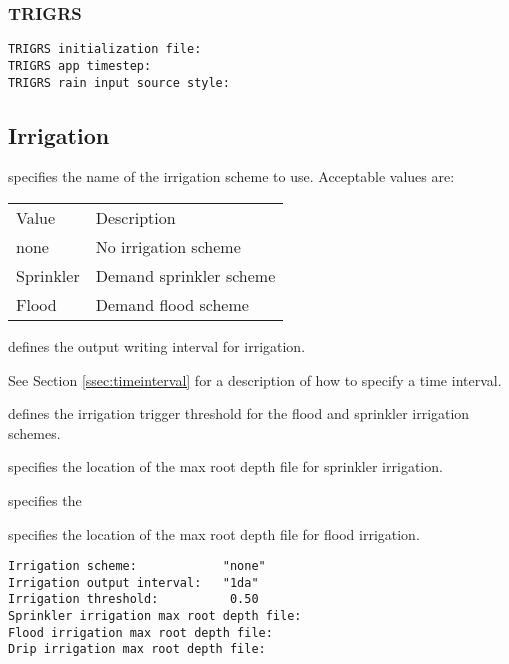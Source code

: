  
 \subsubsection{TRIGRS} \label{sssec:trigrs}
  

  

  
 

 \begin{Verbatim}[frame=single]
TRIGRS initialization file:
TRIGRS app timestep:
TRIGRS rain input source style:
 \end{Verbatim}
 

 
 \subsection{Irrigation} \label{ssec:irrigation}
 

 
  specifies the name of the irrigation
 scheme to use.
 Acceptable values are:

 \begin{tabular}{ll}
 Value     & Description             \\
 none      & No irrigation scheme    \\
 Sprinkler & Demand sprinkler scheme \\
 Flood     & Demand flood scheme \\
 \end{tabular}

  defines the output writing
 interval for irrigation.

 See Section \ref{ssec:timeinterval} for a description
 of how to specify a time interval.

  defines the irrigation trigger
 threshold for the flood and sprinkler irrigation schemes.

  specifies the
 location of the max root depth file for sprinkler irrigation.

  specifies the

  specifies the
 location of the max root depth file for flood irrigation.
 

 \begin{Verbatim}[frame=single]
Irrigation scheme:            "none"
Irrigation output interval:   "1da"
Irrigation threshold:          0.50
Sprinkler irrigation max root depth file:
Flood irrigation max root depth file:
Drip irrigation max root depth file:
 \end{Verbatim}	

